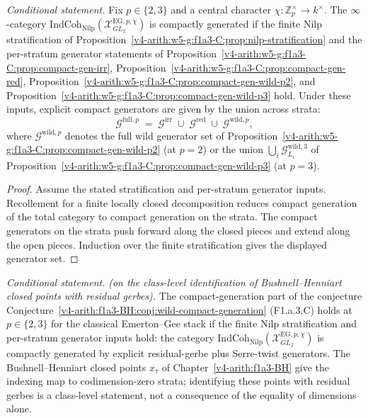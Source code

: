 \begin{theorem}
\label{v4-arith:w5-g:f1a3-C:thm:main}
\emph{Conditional statement.} Fix \(p\in\{2,3\}\) and a central character
\(\chi\colon\mathbb{Z}_{p}^{\times}\to k^{\times}\). The \(\infty\)-category
\(\mathrm{IndCoh}_{\mathrm{Nilp}}(\mathcal{X}^{\mathrm{EG},p,\chi}_{GL_{2}})\)
is compactly generated if the finite Nilp stratification of
Proposition~\ref{v4-arith:w5-g:f1a3-C:prop:nilp-stratification} and the
per-stratum generator statements of
Proposition~\ref{v4-arith:w5-g:f1a3-C:prop:compact-gen-irr},
Proposition~\ref{v4-arith:w5-g:f1a3-C:prop:compact-gen-red},
Proposition~\ref{v4-arith:w5-g:f1a3-C:prop:compact-gen-wild-p2}, and
Proposition~\ref{v4-arith:w5-g:f1a3-C:prop:compact-gen-wild-p3}
hold. Under these inputs, explicit compact generators are given by the
union across strata:
\begin{equation}
\label{v4-arith:w5-g:f1a3-C:eq:full-compact-generator}
\mathcal{G}^{\mathrm{full},p}
\;=\;\mathcal{G}^{\mathrm{irr}}\;\cup\;\mathcal{G}^{\mathrm{red}}\;\cup\;\mathcal{G}^{\mathrm{wild},p},
\end{equation}
where \(\mathcal{G}^{\mathrm{wild},p}\) denotes the full wild generator
set of Proposition~\ref{v4-arith:w5-g:f1a3-C:prop:compact-gen-wild-p2} (at \(p=2\))
or the union \(\bigcup_{i}\mathcal{G}^{\mathrm{wild},3}_{L_{i}}\) of
Proposition~\ref{v4-arith:w5-g:f1a3-C:prop:compact-gen-wild-p3} (at \(p=3\)).
\end{theorem}

\begin{proof}
Assume the stated stratification and per-stratum generator inputs.
Recollement for a finite locally closed decomposition reduces compact
generation of the total category to compact generation on the strata.
The compact generators on the strata push forward along the closed
pieces and extend along the open pieces. Induction over the finite
stratification gives the displayed generator set.
\end{proof}

\begin{corollary}
\label{v4-arith:w5-g:f1a3-C:cor:F1a3C-discharged}
\emph{Conditional statement.} \emph{(on the class-level
identification of Bushnell--Henniart closed points with residual
gerbes).} The compact-generation part of the conjecture
Conjecture~\ref{v4-arith:f1a3-BH:conj:wild-compact-generation} (F1.a.3.C) holds
at \(p\in\{2,3\}\) for the classical Emerton--Gee stack if the
finite Nilp stratification and per-stratum generator inputs hold: the
category
\(\mathrm{IndCoh}_{\mathrm{Nilp}}(\mathcal{X}^{\mathrm{EG},p,\chi}_{GL_{2}})\)
is compactly generated by explicit residual-gerbe plus
Serre-twist generators. The Bushnell--Henniart closed points
\(x_{\tau}\) of Chapter~\ref{v4-arith:f1a3-BH} give the indexing map to
codimension-zero strata; identifying these points with residual gerbes
is a class-level statement, not a consequence of the equality of
dimensions alone.
\end{corollary}


